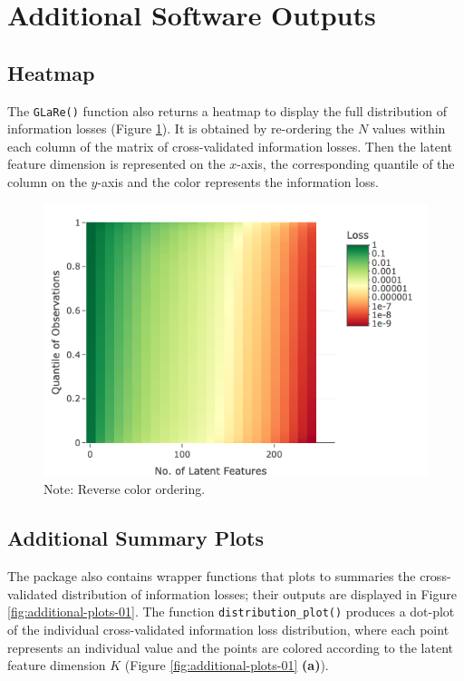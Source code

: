 \section{Additional Software Outputs}\label{sec:additional-outputs}


\subsection{Heatmap}

The \texttt{GLaRe()} function also returns a heatmap to display the full distribution of information losses (Figure \ref{fig:eye-heatmap}).
It is obtained by re-ordering the $N$ values within each column of the matrix of cross-validated information losses.
Then the latent feature dimension is represented on the $x$-axis, the corresponding quantile of the column on the $y$-axis and the color represents the information loss.


\begin{figure}
    \centering
    \includegraphics[width=0.75\linewidth]{figures/eye-heatmap.png}
    \caption{{\color{purple}Note: Reverse color ordering.}}
    \label{fig:eye-heatmap}
\end{figure}

\subsection{Additional Summary Plots}

The  package also contains wrapper functions that plots to summaries the cross-validated distribution of information losses; their outputs are displayed in Figure \ref{fig:additional-plots-01}.
The function \texttt{distribution\_plot()} produces a dot-plot of the individual cross-validated information loss distribution, where each point represents an individual value and the points are colored according to the latent feature dimension $K$ (Figure \ref{fig:additional-plots-01} \textbf{(a)}).


